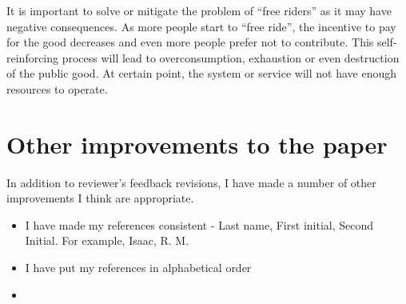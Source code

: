 \documentclass{article}
\newenvironment{itpars}
	{\par\itshape}
	{\par}
\begin{document}
\begin{enumerate}
				\begin{itpars}

					It is important to solve or mitigate the problem of “free riders” as it may have negative consequences. As more people start to “free ride”, the incentive to pay for the good decreases and even more people prefer not to contribute. This self-reinforcing process will lead to overconsumption, exhaustion or even destruction of the public good. At certain point, the system or service will not have enough resources to operate.

				\end{itpars}

		\end{enumerate}

	\clearpage

		\section*{Other improvements to the paper}

			In addition to reviewer's feedback revisions, I have made a number of other improvements I think are appropriate.

			\begin{itemize}
				\item 

					I have made my references consistent - Last name, First initial, Second Initial. For example, Isaac, R. M.

				\item

					I have put my references in alphabetical order

				\item

					

			\end{itemize}
\end{document}
